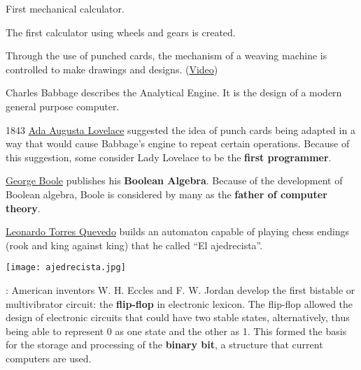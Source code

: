 \begin{description}
    \item[1623] First mechanical calculator.

    \item[1666] The first calculator using wheels and gears is created.

    \item[1801] Through the use of punched cards, the mechanism of a weaving machine is controlled to make drawings and designs. (\href{https://www.youtube.com/watch?v=MQzpLLhN0fY}{Video})

    \item[1837] Charles Babbage describes the Analytical Engine. It is the design of a modern general purpose computer.

    \begin{minipage}{0.7\linewidth}
        \item[1843] \href{https://en.wikipedia.org/wiki/Ada_Lovelace}{Ada Augusta Lovelace} suggested the idea of punch cards being adapted in a way that would cause Babbage's engine to repeat certain operations. Because of this suggestion, some consider Lady Lovelace to be the \textbf{first programmer}.
    \end{minipage}
    \hfill
    \begin{minipage}{0.2\linewidth}
        \hfill
        
    \end{minipage}

    \item[1854] \href{https://en.wikipedia.org/wiki/George_Boole}{George Boole} publishes his \textbf{Boolean Algebra}. Because of the development of Boolean algebra, Boole is considered by many as the \textbf{father of computer theory}.

    \item [1912] \href {https://es.wikipedia.org/wiki/Leonardo_Torres_Quevedo}{Leonardo Torres Quevedo} builds an automaton capable of playing chess endings (rook and king against king) that he called “El ajedrecista”.

    \begin{center}
        \texttt{[image: ajedrecista.jpg]}
    \end{center}

    \item[1919]: American inventors W. H. Eccles and F. W. Jordan develop the first bistable or multivibrator circuit: the \textbf{flip-flop} in electronic lexicon. The flip-flop allowed the design of electronic circuits that could have two stable states, alternatively, thus being able to represent 0 as one state and the other as 1. This formed the basis for the storage and processing of the \textbf{binary bit}, a structure that current computers are used.


\end{description}
